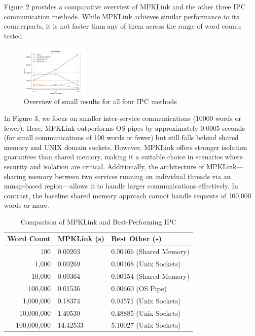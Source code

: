 \documentclass[letterpaper,twocolumn,10pt]{article}
\begin{document}
Figure 2 provides a comparative overview of MPKLink and the other three IPC communication methods. While MPKLink achieves similar performance to its counterparts, it is not faster than any of them across the range of word counts tested.

\begin{figure}[h]
    \centering
    \includegraphics[width=0.3\textwidth]{../benchmark/2024-12-08_17-19-30/overview2.png}
    \caption{Overview of small results for all four IPC methods}
\end{figure}

In Figure 3, we focus on smaller inter-service communications (10000 words or fewer). Here, MPKLink outperforms OS pipes by approximately 0.0005 seconds (for small communications of 100 words or fewer) but still falls behind shared memory and UNIX domain sockets. However, MPKLink offers stronger isolation guarantees than shared memory, making it a suitable choice in scenarios where security and isolation are critical. Additionally, the architecture of MPKLink—sharing memory between two services running on individual threads via an mmap-based region—allows it to handle larger communications effectively. In contrast, the baseline shared memory approach cannot handle requests of 100,000 words or more.

\begin{table}[h!]
    \centering
    \label{tab:ipc-best}
    \begin{tabular}{|r|l|l|}
        \toprule
        \hline
        \textbf{Word Count} & \textbf{MPKLink (s)} & \textbf{Best Other (s)} \\
        \midrule
        100       & 0.00203        & 0.00166 (Shared Memory) \\
        1,000     & 0.00269        & 0.00168 (Unix Sockets) \\
        10,000    & 0.00364        & 0.00154 (Shared Memory) \\
        100,000   & 0.01536        & 0.00660 (OS Pipe) \\
        1,000,000 & 0.18374        & 0.04571 (Unix Sockets) \\
        10,000,000 & 1.40530       & 0.48885 (Unix Sockets) \\
        100,000,000 & 14.42533     & 5.10027 (Unix Sockets) \\
        \hline
        \bottomrule
    \end{tabular}
    \caption{Comparison of MPKLink and Best-Performing IPC}
\end{table}
\end{document}
